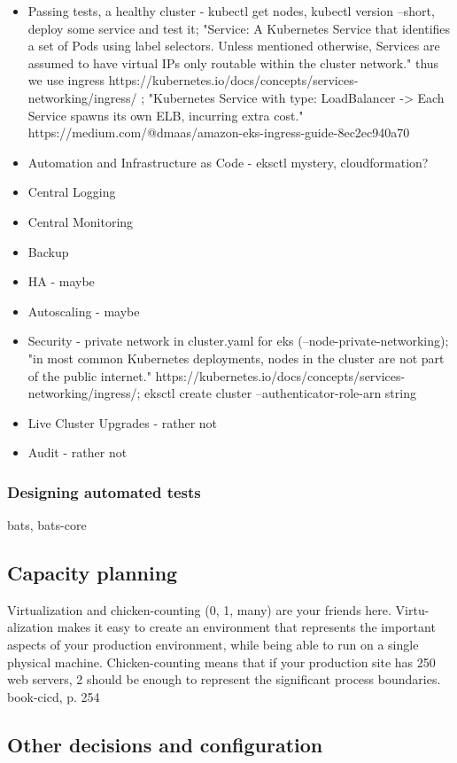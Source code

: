 \begin{itemize}
\item Passing tests, a healthy cluster - kubectl get nodes, kubectl version --short, deploy some service and test it; "Service: A Kubernetes Service that identifies a set of Pods using label selectors. Unless mentioned otherwise, Services are assumed to have virtual IPs only routable within the cluster network." thus we use ingress https://kubernetes.io/docs/concepts/services-networking/ingress/ ; "Kubernetes Service with type: LoadBalancer -> Each Service spawns its own ELB, incurring extra cost." https://medium.com/@dmaas/amazon-eks-ingress-guide-8ec2ec940a70
\item Automation and Infrastructure as Code - eksctl mystery, cloudformation?
\item Central Logging
\item Central Monitoring
\item Backup
\item HA - maybe
\item Autoscaling - maybe
\item Security - private network in cluster.yaml for eks (--node-private-networking); "in most common Kubernetes deployments, nodes in the cluster are not part of the public internet." https://kubernetes.io/docs/concepts/services-networking/ingress/; eksctl create cluster --authenticator-role-arn string
\item Live Cluster Upgrades - rather not
\item Audit - rather not
\end{itemize}

\subsubsection{Designing automated tests}
bats, bats-core

\subsection{Capacity planning}
Virtualization and chicken-counting (0, 1, many) are your friends here. Virtu-
alization makes it easy to create an environment that represents the important
aspects of your production environment, while being able to run on a single
physical machine. Chicken-counting means that if your production site has
250 web servers, 2 should be enough to represent the significant process
boundaries. book-cicd, p. 254

\subsection{Other decisions and configuration}

